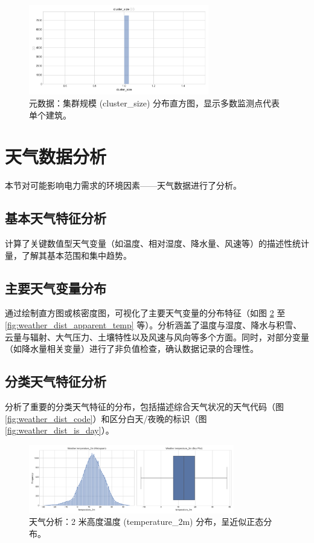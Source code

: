 \documentclass{article} %
\begin{document}
\begin{figure}[H]
    \centering
    \includegraphics[width=0.7\textwidth]{../plots/metadata_hist_cluster_size.png}
    \caption{元数据：集群规模 (cluster\_size) 分布直方图，显示多数监测点代表单个建筑。} %
    \label{fig:metadata_hist_cluster_size}
\end{figure}

\section{天气数据分析}
\label{sec:weather_analysis}

本节对可能影响电力需求的环境因素——天气数据进行了分析。

\subsection{基本天气特征分析}
\label{subsec:basic_weather}
计算了关键数值型天气变量（如温度、相对湿度、降水量、风速等）的描述性统计量，了解其基本范围和集中趋势。

\subsection{主要天气变量分布}
\label{subsec:major_weather_dist}
通过绘制直方图或核密度图，可视化了主要天气变量的分布特征（如图 \ref{fig:weather_dist_temp} 至 \ref{fig:weather_dist_apparent_temp} 等）。分析涵盖了温度与湿度、降水与积雪、云量与辐射、大气压力、土壤特性以及风速与风向等多个方面。同时，对部分变量（如降水量相关变量）进行了非负值检查，确认数据记录的合理性。

\subsection{分类天气特征分析}
\label{subsec:categorical_weather}
分析了重要的分类天气特征的分布，包括描述综合天气状况的天气代码（图 \ref{fig:weather_dist_code}）和区分白天/夜晚的标识（图 \ref{fig:weather_dist_is_day}）。

\begin{figure}[H]
    \centering
    \includegraphics[width=0.8\textwidth]{../plots/weather_distribution_temperature_2m.png}
    \caption{天气分析：2 米高度温度 (temperature\_2m) 分布，呈近似正态分布。} %
    \label{fig:weather_dist_temp}
\end{figure}
\end{document}

